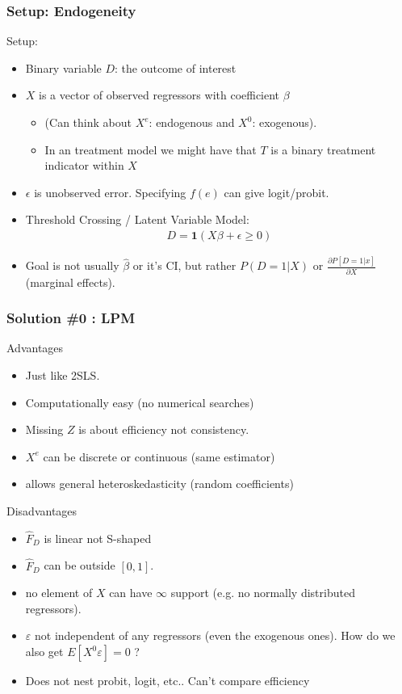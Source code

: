 \begin{frame}
\frametitle{Setup: Endogeneity}
Setup:
\begin{itemize}
\item Binary variable $D$: the outcome of interest
\item $X$ is a vector of observed regressors with coefficient $\beta$ 
\begin{itemize}
\item (Can think about $X^e$: endogenous and $X^0$: exogenous).
\item In an treatment model we might have that $T$ is a binary treatment indicator within $X$
\end{itemize}
\item $\epsilon$ is unobserved error. Specifying $f(e)$ can give logit/probit.
\item Threshold Crossing / Latent Variable Model:
\begin{eqnarray*}
D = \mathbf{1}(X \beta + \epsilon \geq 0)
\end{eqnarray*}
\item Goal is not usually $\hat{\beta}$ or it's CI, but rather $P(D=1 | X)$ or $\frac{\partial P[D=1 | x] }{\partial X}$ (marginal effects).
\end{itemize}
\end{frame}

\begin{frame}
\frametitle{Solution \#0 : LPM}
\vspace{-10pt}
\begin{block}{Advantages}
\vspace{-5pt}       
\begin{itemize}
\item Just like 2SLS.
\item Computationally easy (no numerical searches)
\item Missing $Z$ is about efficiency not consistency.
\item $X^e$ can be discrete or continuous (same estimator)
\item allows general heteroskedasticity (random coefficients)
\end{itemize}
\end{block}
\vspace{-5pt}       

\begin{block}{Disadvantages}
\vspace{-5pt}
\begin{itemize}
\item $\hat{F}_D$ is linear not S-shaped
\item $\hat{F}_D$ can be outside $[0,1]$.
\item no element of $X$ can have $\infty$ support (e.g. no normally distributed regressors).
\item $\varepsilon$ not independent of any regressors  (even the exogenous ones). How do we also get $E[X^0 \varepsilon] =0$ ?
\item Does not nest probit, logit, etc.. Can't compare efficiency
\end{itemize}
\end{block}
\end{frame}


